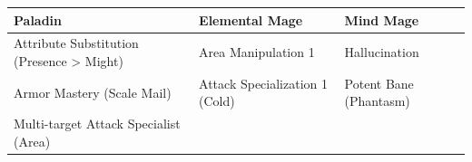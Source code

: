 \documentclass[12pt]{report}
\begin{document}
\begin{longtable}[c]{@{}lll@{}}
\toprule
\begin{minipage}[b]{0.03\columnwidth}\raggedright\strut
Paladin
\strut\end{minipage} &
\begin{minipage}[b]{0.03\columnwidth}\raggedright\strut
Elemental Mage
\strut\end{minipage} &
\begin{minipage}[b]{0.03\columnwidth}\raggedright\strut
Mind Mage
\strut\end{minipage}\tabularnewline
\midrule
\endhead
\begin{minipage}[t]{0.03\columnwidth}\raggedright\strut
Attribute Substitution (Presence \textgreater{} Might)
\strut\end{minipage} &
\begin{minipage}[t]{0.03\columnwidth}\raggedright\strut
Area Manipulation 1
\strut\end{minipage} &
\begin{minipage}[t]{0.03\columnwidth}\raggedright\strut
Hallucination
\strut\end{minipage}\tabularnewline
\begin{minipage}[t]{0.03\columnwidth}\raggedright\strut
Armor Mastery (Scale Mail)
\strut\end{minipage} &
\begin{minipage}[t]{0.03\columnwidth}\raggedright\strut
Attack Specialization 1 (Cold)
\strut\end{minipage} &
\begin{minipage}[t]{0.03\columnwidth}\raggedright\strut
Potent Bane (Phantasm)
\strut\end{minipage}\tabularnewline
\begin{minipage}[t]{0.03\columnwidth}\raggedright\strut
Multi-target Attack Specialist (Area)
\strut\end{minipage} &
\begin{minipage}[t]{0.03\columnwidth}\raggedright\strut
\strut\end{minipage} &
\begin{minipage}[t]{0.03\columnwidth}\raggedright\strut
\strut\end{minipage}\tabularnewline
\bottomrule
\end{longtable}
\end{document}

